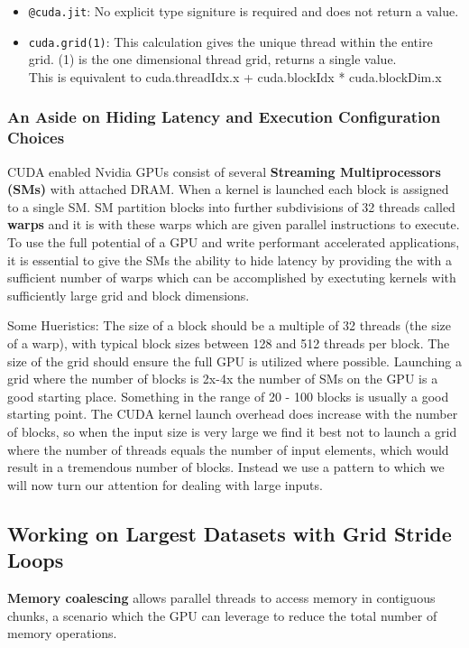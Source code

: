 \documentclass{article}
\begin{document}
\begin{itemize}
	\item \verb_@cuda.jit_: No explicit type signiture is required and does not return a value. 
	\item \verb_cuda.grid(1)_: This calculation gives the unique thread within the entire grid. (1) is the one dimensional thread grid, returns a single value. \\

This is equivalent to cuda.threadIdx.x + cuda.blockIdx * cuda.blockDim.x

\end{itemize}

\subsubsection{An Aside on Hiding Latency and Execution Configuration Choices}

CUDA enabled Nvidia GPUs consist of several \textbf{Streaming Multiprocessors (SMs)} with attached DRAM. When a kernel is launched each block is assigned to a single SM. SM partition blocks into further subdivisions of 32 threads called \textbf{warps} and it is with these warps which are given parallel instructions to execute.\\

To use the full potential of a GPU and write performant accelerated applications, it is essential to give the SMs the ability to hide latency by providing the with a sufficient number of warps which can be accomplished by exectuting kernels with sufficiently large grid and block dimensions.

Some Hueristics:
The size of a block should be a multiple of 32 threads (the size of a warp), with typical block sizes between 128 and 512 threads per block.
The size of the grid should ensure the full GPU is utilized where possible. Launching a grid where the number of blocks is 2x-4x the number of SMs on the GPU is a good starting place. Something in the range of 20 - 100 blocks is usually a good starting point.
The CUDA kernel launch overhead does increase with the number of blocks, so when the input size is very large we find it best not to launch a grid where the number of threads equals the number of input elements, which would result in a tremendous number of blocks. Instead we use a pattern to which we will now turn our attention for dealing with large inputs.

\subsection{Working on Largest Datasets with Grid Stride Loops}

\textbf{Memory coalescing} allows parallel threads to access memory in contiguous chunks, a scenario which the GPU can leverage to reduce the total number of memory operations.
\end{document}
